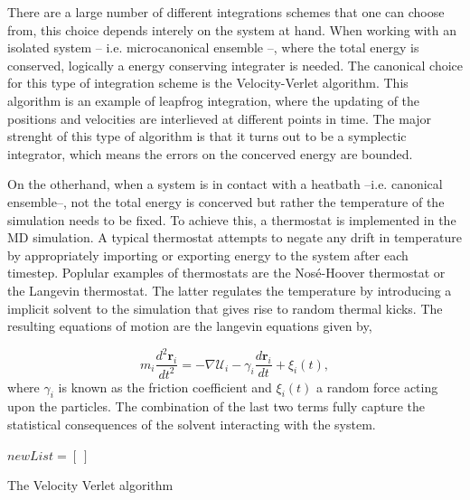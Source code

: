 \noindent There are a large number of different integrations schemes that one can choose
from, this
choice depends interely on the system at hand.
When working with an isolated system -- i.e. microcanonical ensemble --, where the total
energy is conserved, logically a energy conserving integrater is needed. The canonical
choice for this type of integration scheme is the Velocity-Verlet algorithm. This
algorithm is an example of leapfrog integration, where the updating of the positions
and velocities are interlieved at different points in time. The major strenght of this
type of algorithm is that it turns out to be a symplectic integrator, which means the
errors on the concerved energy are bounded.

On the otherhand, when a system is in contact with a heatbath --i.e. canonical
ensemble--, not the total energy is concerved but rather the temperature of the
simulation needs to be fixed. To achieve this, a thermostat is implemented in the MD
simulation. A typical thermostat attempts to negate any drift in temperature by
appropriately importing or exporting energy to the system after each timestep.
Poplular examples of thermostats are the Nos\'e-Hoover thermostat or the Langevin
thermostat.  The latter regulates the temperature by introducing a implicit solvent to
the simulation that gives rise to random thermal kicks. The resulting equations of motion
are the langevin equations given by,

\begin{equation}
    m_i \frac{d^2 \boldsymbol{r}_i}{dt^2} = - \nabla \mathcal{U}_i - \gamma_i \frac{d
    \boldsymbol{r}_i}{d t} +
    \xi_i(t),
\end{equation}
where $\gamma_i$ is known  as the friction coefficient and $\xi_i(t)$ a random force
acting upon the particles. The combination of the last two terms fully capture the
statistical consequences of the solvent interacting with the system.


\begin{algorithm}


    $newList = [\ ]$



    \caption{The Velocity Verlet algorithm}
\end{algorithm}


